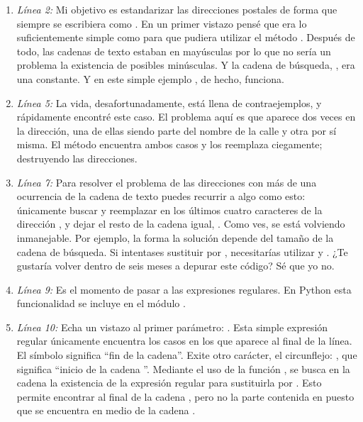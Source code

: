 \begin{enumerate}

\item \emph{Línea 2:} Mi objetivo es estandarizar las direcciones postales de forma que  siempre se escribiera como . En un primer vistazo pensé que era lo suficientemente simple como para que pudiera utilizar el método . Después de todo, las cadenas de texto estaban en mayúsculas por lo que no sería un problema la existencia de posibles minúsculas. Y la cadena de búsqueda, , era una constante. Y en este simple ejemplo , de hecho, funciona.

\item \emph{Línea 5:} La vida, desafortunadamente, está llena de contraejemplos, y rápidamente encontré este caso. El problema aquí es que  aparece dos veces en la dirección, una de ellas siendo parte del nombre de la calle  y otra por sí misma. El método  encuentra ambos casos y los reemplaza ciegamente; destruyendo las direcciones.

\item \emph{Línea 7:} Para resolver el problema de las direcciones con más de una ocurrencia de la cadena de texto  puedes recurrir a algo como esto: únicamente buscar y reemplazar  en los últimos cuatro caracteres de la dirección , y dejar el resto de la cadena igual, . Como ves, se está volviendo inmanejable. Por ejemplo, la forma la solución depende del tamaño de la cadena de búsqueda. Si intentases sustituir  por , necesitarías utilizar  y . ¿Te gustaría volver dentro de seis meses a depurar este código? Sé que yo no.

\item \emph{Línea 9:} Es el momento de pasar a las expresiones regulares. En Python esta funcionalidad se incluye en el módulo .

\item \emph{Línea 10:} Echa un vistazo al primer parámetro: . Esta  simple expresión regular únicamente encuentra los casos en los que  aparece al final de la línea. El símbolo \codigo{\$} significa ``fin de la cadena''. Exite otro carácter, el circunflejo: \codigo{\^}, que significa ``inicio de la cadena ''. Mediante el uso de la función , se busca en la cadena  la existencia de la expresión regular  para sustituirla por . Esto permite encontrar  al final de la cadena , pero no la parte contenida en  puesto que se encuentra en medio de la cadena .

\end{enumerate}

